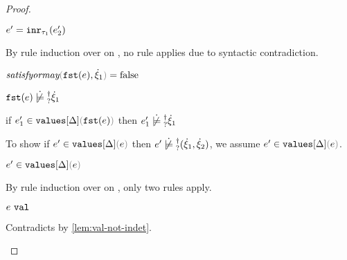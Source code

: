 \begin{proof}
\begin{byCases}
\begin{byCases}
\begin{byCases}
\begin{byCases}
\begin{byCases}
\begin{byCases}
\begin{byCases}
                \begin{pfsteps*} 
                \item $e'=\mathtt{inr}_{\tau_1}({e_2'})$ 
                \end{pfsteps*}
                By rule induction over  on , no rule applies due to syntactic contradiction.
              \end{byCases}
            \end{byCases}
          \end{byCases}

          \item[\false] 
          \begin{pfsteps*}
          \item $\fsatisfyormay{\hfst{e}}{\hxi_1}=\false$  
          \item $\cnotsatisfyormay{\hfst{e}}{\hxi_1}$  
          \item if $\inValues{e_1'}{\Delta}{\hfst{e}}$ then $\cnotsatisfyormay{e_1'}{\hxi_1}$  
          \end{pfsteps*} 
          To show if $\inValues{e'}{\Delta}{e}$ then $\cnotsatisfyormay{e'}{\cpair{\hxi_1}{\hxi_2}}$, we assume $\inValues{e'}{\Delta}{e}$.
          \begin{pfsteps*}
          \item $\inValues{e'}{\Delta}{e}$  
          \end{pfsteps*}
          By rule induction over  on , only two rules apply.
          \begin{byCases}
            \item[\text{(\ref{rule:IVVal})}]
            \begin{pfsteps*}
            \item $e ~\mathtt{val}$ 
            \end{pfsteps*} 
            Contradicts  by \autoref{lem:val-not-indet}.
            \item[\text{(\ref{rule:IVIndet})}] 
            \begin{pfsteps*}

\end{pfsteps*}
\end{byCases}
\end{byCases}
\end{byCases}
\end{byCases}
\end{byCases}
\end{proof}
